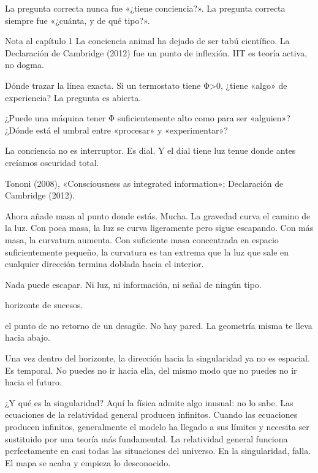 La pregunta correcta nunca fue «¿tiene conciencia?». La pregunta correcta siempre fue «¿cuánta, y de qué tipo?».

\begin{notacap}{Nota al capítulo 1}
 La conciencia animal ha dejado de ser tabú científico. La Declaración de Cambridge (2012) fue un punto de inflexión. IIT es teoría activa, no dogma.

 Dónde trazar la línea exacta. Si un termostato tiene Φ>0, ¿tiene «algo» de experiencia? La pregunta es abierta.

 ¿Puede una máquina tener Φ suficientemente alto como para ser «alguien»? ¿Dónde está el umbral entre «procesar» y «experimentar»?

 La conciencia no es interruptor. Es dial. Y el dial tiene luz tenue donde antes creíamos oscuridad total.

 Tononi (2008), «Consciousness as integrated information»; Declaración de Cambridge (2012).
\end{notacap}
\noindent {}

Ahora añade masa al punto donde estás. Mucha. La gravedad curva el camino de la luz. Con poca masa, la luz se curva ligeramente pero sigue escapando. Con más masa, la curvatura aumenta. Con suficiente masa concentrada en espacio suficientemente pequeño, la curvatura es tan extrema que la luz que sale en cualquier dirección termina doblada hacia el interior.

Nada puede escapar. Ni luz, ni información, ni señal de ningún tipo.

\begin{fisica}
 horizonte de sucesos.

 el punto de no retorno de un desagüe. No hay pared. La geometría misma te lleva hacia abajo.
\end{fisica}
\noindent Una vez dentro del horizonte, la dirección hacia la singularidad ya no es espacial. Es temporal. No puedes no ir hacia ella, del mismo modo que no puedes no ir hacia el futuro.

¿Y qué es la singularidad? Aquí la física admite algo inusual: no lo sabe. Las ecuaciones de la relatividad general producen infinitos. Cuando las ecuaciones producen infinitos, generalmente el modelo ha llegado a sus límites y necesita ser sustituido por una teoría más fundamental. La relatividad general funciona perfectamente en casi todas las situaciones del universo. En la singularidad, falla. El mapa se acaba y empieza lo desconocido.

